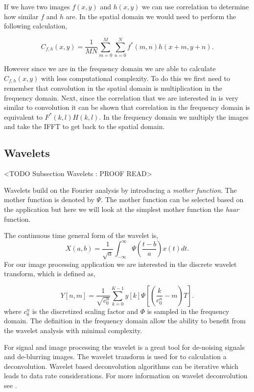If we have two images $f(x,y)$ and $h(x,y)$ we can use correlation to determine how similar $f$ and $h$ are. In the spatial domain we would need to perform the following calculation,

\begin{equation}
C_{f,h}(x,y) = \frac{1}{MN}\sum_{m=0}^{M}\sum_{n=0}^{N}f^*(m,n)h(x+m,y+n).
\end{equation}
\noindent

However since we are in the frequency domain we are able to calculate $C_{f,h}(x,y)$ with less computational complexity. To do this we first need to remember that convolution in the spatial domain is multiplication in the frequency domain. Next, since the correlation that we are interested in is very similar to convolution it can be shown that correlation in the frequency domain is equivalent to $F^*(k,l)H(k,l)$. In the frequency domain we multiply the images and take the \ac{IFFT} to get back to the spatial domain. 

\subsection{Wavelets}
	<TODO Subsection Wavelets : PROOF READ>

Wavelets build on the Fourier analysis by introducing a \emph{mother function}. The mother function is denoted by $\Psi$. The mother function can be selected based on the application but here we will look at the simplest mother function the \emph{haar} function.

The continuous time general form of the wavelet is,
\begin{equation}
X(a,b) = \frac{1}{\sqrt{a}}\int_{-\infty}^{\infty}\Psi\left(\frac{t-b}{a}\right) x(t)dt.
\end{equation}
\noindent
For our image processing application we are interested in the discrete wavelet transform, which is defined as,

\begin{equation}
Y[n,m] = \frac{1}{\sqrt{c_0^n}}\sum_{k=0}^{K-1}y[k]\Psi\left[\left(\frac{k}{c_0^n}-m\right)T\right].
\end{equation}
\noindent
where $c_0^n$ is the discretized scaling factor and $\Phi$ is sampled in the frequency domain. The definition in the frequency domain allow the ability to benefit from the wavelet analysis with minimal complexity. 



For signal and image processing the wavelet is a great tool for de-noising signals and de-blurring images. The wavelet transform is used for to calculation a deconvolution. Wavelet based deconvolution algorithms can be iterative which leads to data rate considerations. For more information on wavelet deconvolution see \cite{Emerging applications of wavelets: A review}.

